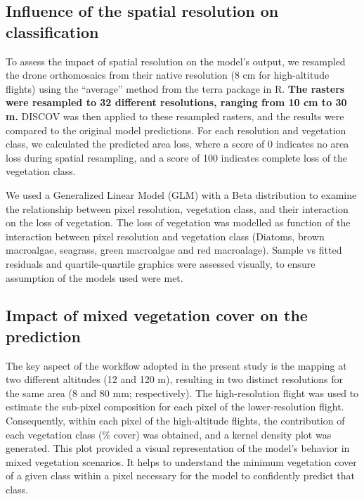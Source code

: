 \documentclass[
  number]{elsarticle}
\begin{document}
\subsection{Influence of the spatial resolution on
classification}\label{influence-of-the-spatial-resolution-on-classification}

To assess the impact of spatial resolution on the model's output, we
resampled the drone orthomosaics from their native resolution (8 cm for
high-altitude flights) using the ``average'' method from the terra
package in R. \textbf{The rasters were resampled to 32 different
resolutions, ranging from 10 cm to 30 m.} DISCOV was then applied to
these resampled rasters, and the results were compared to the original
model predictions. For each resolution and vegetation class, we
calculated the predicted area loss, where a score of 0 indicates no area
loss during spatial resampling, and a score of 100 indicates complete
loss of the vegetation class.

We used a Generalized Linear Model (GLM) with a Beta distribution to
examine the relationship between pixel resolution, vegetation class, and
their interaction on the loss of vegetation. The loss of vegetation was
modelled as function of the interaction between pixel resolution and
vegetation class (Diatoms, brown macroalgae, seagrass, green macroalgae
and red macroalage). Sample vs fitted residuals and quartile-quartile
graphics were assessed visually, to ensure assumption of the models used
were met.

\subsection{Impact of mixed vegetation cover on the
prediction}\label{impact-of-mixed-vegetation-cover-on-the-prediction}

The key aspect of the workflow adopted in the present study is the
mapping at two different altitudes (12 and 120 m), resulting in two
distinct resolutions for the same area (8 and 80 mm; respectively). The
high-resolution flight was used to estimate the sub-pixel composition
for each pixel of the lower-resolution flight. Consequently, within each
pixel of the high-altitude flights, the contribution of each vegetation
class (\% cover) was obtained, and a kernel density plot was generated.
This plot provided a visual representation of the model's behavior in
mixed vegetation scenarios. It helps to understand the minimum
vegetation cover of a given class within a pixel necessary for the model
to confidently predict that class.
\end{document}
